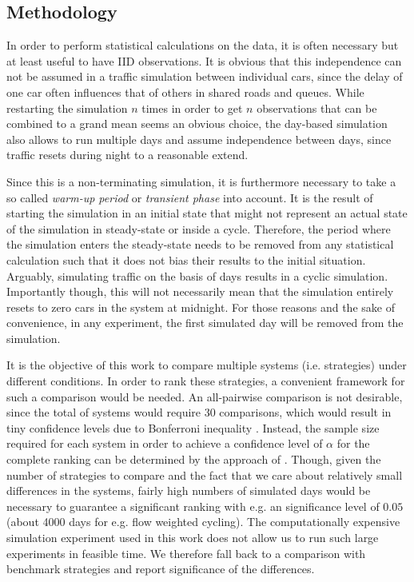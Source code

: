 \documentclass[11pt]{article}
\begin{document}
\subsection{Methodology}
In order to perform statistical calculations on the data, it is often necessary but at least useful to have IID observations. It is obvious that this independence can not be assumed in a traffic simulation between individual cars, since the delay of one car often influences that of others in shared roads and queues. While restarting the simulation $n$ times in order to get $n$ observations that can be combined to a grand mean seems an obvious choice, the day-based simulation also allows to run multiple days and assume independence between days, since traffic resets during night to a reasonable extend.

Since this is a non-terminating simulation, it is furthermore necessary to take a so called \textit{warm-up period} or \textit{transient phase} into account. It is the result of starting the simulation in an initial state that might not represent an actual state of the simulation in steady-state or inside a cycle. Therefore, the period where the simulation enters the steady-state needs to be removed from any statistical calculation such that it does not bias their results to the initial situation. Arguably, simulating traffic on the basis of days results in a cyclic simulation. Importantly though, this will not necessarily mean that the simulation entirely resets to zero cars in the system at midnight. For those reasons and the sake of convenience, in any experiment, the first simulated day will be removed from the simulation.

It is the objective of this work to compare multiple systems (i.e. strategies) under different conditions. In order to rank these strategies, a convenient framework for such a comparison would be needed. An all-pairwise comparison is not desirable, since the total of  systems would require 30 comparisons, which would result in tiny confidence levels due to Bonferroni inequality \citep[see e.g.][]{law2007simulation}. Instead, the sample size required for each system in order to achieve a confidence level of $\alpha$ for the complete ranking can be determined by the approach of \citet{dudewicz1975allocation}. Though, given the number of strategies to compare and the fact that we care about relatively small differences in the systems, fairly high numbers of simulated days would be necessary to guarantee a significant ranking with e.g. an significance level of $0.05$ (about 4000 days for e.g. flow weighted cycling). The computationally expensive simulation experiment used in this work does not allow us to run such large experiments in feasible time. We therefore fall back to a comparison with benchmark strategies and report significance of the differences.
\end{document}

